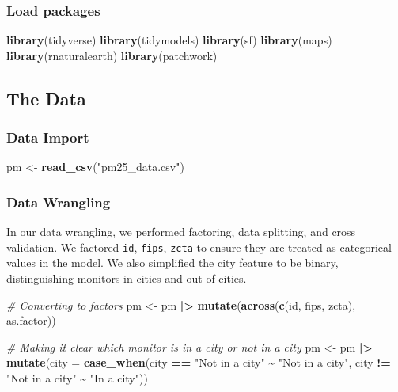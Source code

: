\documentclass[
]{article}
\newenvironment{Shaded}{\begin{snugshade}}{\end{snugshade}}
\newcommand{\AttributeTok}[1]{\textcolor[rgb]{0.13,0.29,0.53}{#1}}
\newcommand{\CommentTok}[1]{\textcolor[rgb]{0.56,0.35,0.01}{\textit{#1}}}
\newcommand{\FunctionTok}[1]{\textcolor[rgb]{0.13,0.29,0.53}{\textbf{#1}}}
\newcommand{\NormalTok}[1]{#1}
\newcommand{\OtherTok}[1]{\textcolor[rgb]{0.56,0.35,0.01}{#1}}
\newcommand{\SpecialCharTok}[1]{\textcolor[rgb]{0.81,0.36,0.00}{\textbf{#1}}}
\newcommand{\StringTok}[1]{\textcolor[rgb]{0.31,0.60,0.02}{#1}}
\begin{document}
\subsubsection{Load packages}\label{load-packages}

\begin{Shaded}
\begin{Highlighting}[]
\FunctionTok{library}\NormalTok{(tidyverse)}
\FunctionTok{library}\NormalTok{(tidymodels)}
\FunctionTok{library}\NormalTok{(sf)}
\FunctionTok{library}\NormalTok{(maps)}
\FunctionTok{library}\NormalTok{(rnaturalearth)}
\FunctionTok{library}\NormalTok{(patchwork)}
\end{Highlighting}
\end{Shaded}

\subsection{The Data}\label{the-data}

\subsubsection{Data Import}\label{data-import}

\begin{Shaded}
\begin{Highlighting}[]
\NormalTok{pm }\OtherTok{\textless{}{-}} \FunctionTok{read\_csv}\NormalTok{(}\StringTok{"pm25\_data.csv"}\NormalTok{)}
\end{Highlighting}
\end{Shaded}

\subsubsection{Data Wrangling}\label{data-wrangling}

In our data wrangling, we performed factoring, data splitting, and cross
validation. We factored \texttt{id}, \texttt{fips}, \texttt{zcta} to
ensure they are treated as categorical values in the model. We also
simplified the city feature to be binary, distinguishing monitors in
cities and out of cities.

\begin{Shaded}
\begin{Highlighting}[]
\CommentTok{\# Converting to factors}
\NormalTok{pm }\OtherTok{\textless{}{-}}\NormalTok{ pm }\SpecialCharTok{|\textgreater{}}
  \FunctionTok{mutate}\NormalTok{(}\FunctionTok{across}\NormalTok{(}\FunctionTok{c}\NormalTok{(id, fips, zcta), as.factor)) }

\CommentTok{\# Making it clear which monitor is in a city or not in a city}
\NormalTok{pm }\OtherTok{\textless{}{-}}\NormalTok{ pm }\SpecialCharTok{|\textgreater{}}
  \FunctionTok{mutate}\NormalTok{(}\AttributeTok{city =} \FunctionTok{case\_when}\NormalTok{(city }\SpecialCharTok{==} \StringTok{"Not in a city"} \SpecialCharTok{\textasciitilde{}} \StringTok{"Not in a city"}\NormalTok{,}
\NormalTok{                          city }\SpecialCharTok{!=} \StringTok{"Not in a city"} \SpecialCharTok{\textasciitilde{}} \StringTok{"In a city"}\NormalTok{))}
\end{Highlighting}
\end{Shaded}
\end{document}
